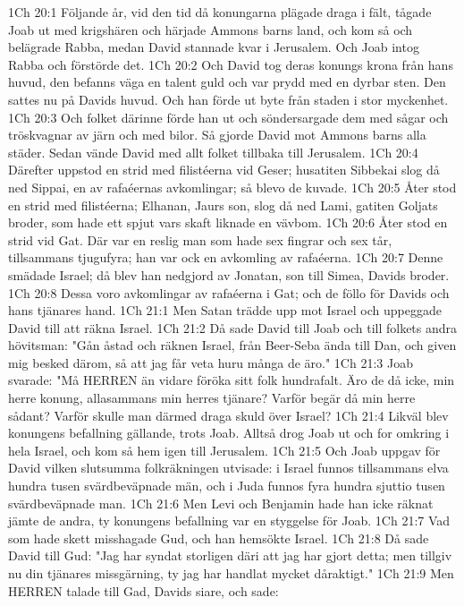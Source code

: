 1Ch 20:1  Följande år, vid den tid då konungarna plägade draga i fält, tågade Joab ut med krigshären och härjade Ammons barns land, och kom så och belägrade Rabba, medan David stannade kvar i Jerusalem. Och Joab intog Rabba och förstörde det.
1Ch 20:2  Och David tog deras konungs krona från hans huvud, den befanns väga en talent guld och var prydd med en dyrbar sten. Den sattes nu på Davids huvud. Och han förde ut byte från staden i stor myckenhet.
1Ch 20:3  Och folket därinne förde han ut och söndersargade dem med sågar och tröskvagnar av järn och med bilor. Så gjorde David mot Ammons barns alla städer. Sedan vände David med allt folket tillbaka till Jerusalem.
1Ch 20:4  Därefter uppstod en strid med filistéerna vid Geser; husatiten Sibbekai slog då ned Sippai, en av rafaéernas avkomlingar; så blevo de kuvade.
1Ch 20:5  Åter stod en strid med filistéerna; Elhanan, Jaurs son, slog då ned Lami, gatiten Goljats broder, som hade ett spjut vars skaft liknade en vävbom.
1Ch 20:6  Åter stod en strid vid Gat. Där var en reslig man som hade sex fingrar och sex tår, tillsammans tjugufyra; han var ock en avkomling av rafaéerna.
1Ch 20:7  Denne smädade Israel; då blev han nedgjord av Jonatan, son till Simea, Davids broder.
1Ch 20:8  Dessa voro avkomlingar av rafaéerna i Gat; och de föllo för Davids och hans tjänares hand.
1Ch 21:1  Men Satan trädde upp mot Israel och uppeggade David till att räkna Israel.
1Ch 21:2  Då sade David till Joab och till folkets andra hövitsman: "Gån åstad och räknen Israel, från Beer-Seba ända till Dan, och given mig besked därom, så att jag får veta huru många de äro."
1Ch 21:3  Joab svarade: "Må HERREN än vidare föröka sitt folk hundrafalt. Äro de då icke, min herre konung, allasammans min herres tjänare? Varför begär då min herre sådant? Varför skulle man därmed draga skuld över Israel?
1Ch 21:4  Likväl blev konungens befallning gällande, trots Joab. Alltså drog Joab ut och for omkring i hela Israel, och kom så hem igen till Jerusalem.
1Ch 21:5  Och Joab uppgav för David vilken slutsumma folkräkningen utvisade: i Israel funnos tillsammans elva hundra tusen svärdbeväpnade män, och i Juda funnos fyra hundra sjuttio tusen svärdbeväpnade man.
1Ch 21:6  Men Levi och Benjamin hade han icke räknat jämte de andra, ty konungens befallning var en styggelse för Joab.
1Ch 21:7  Vad som hade skett misshagade Gud, och han hemsökte Israel.
1Ch 21:8  Då sade David till Gud: "Jag har syndat storligen däri att jag har gjort detta; men tillgiv nu din tjänares missgärning, ty jag har handlat mycket dåraktigt."
1Ch 21:9  Men HERREN talade till Gad, Davids siare, och sade:
